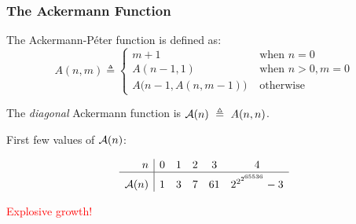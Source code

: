\begin{frame}
\frametitle{The Ackermann Function}
	
	The Ackermann-P\'eter function is defined as:
	\begin{equation*}
	A(n, m) \triangleq \begin{cases}
	m + 1 & \text{ when } n = 0 \\
	A(n-1, 1) & \text{ when } n > 0, m = 0 \\
	A\big(n-1, A(n, m-1)\big) & \text{ otherwise}
	\end{cases}
	\end{equation*}
	
	\pause 
	The \emph{diagonal} Ackermann function is $\mathcal{A}(n)~\triangleq~A(n, n)$.
	
	\bigskip
	
	\pause 
	First few values of $\mathcal{A}(n)$:
	
  \begin{minipage}{0.5\linewidth}
		\begin{equation*}
	\begin{array}{r|ccccc}
	 n & 0 & 1 & 2 & 3 & 4 \\ \hline
	 \Ack(n) & 1 & 3 & 7 & 61 & 2^{2^{2^{65536}}} - 3 \topspace{3pt}
	\end{array}
	\end{equation*}
  \end{minipage}
  \quad \pause 
  \begin{minipage}{0.4\linewidth}
  	\textcolor{red}{Explosive growth!}
  \end{minipage}

\end{frame}


